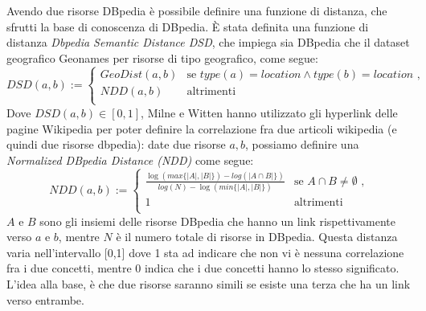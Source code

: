 Avendo due risorse DBpedia è possibile definire una funzione di distanza, che sfrutti la base di conoscenza di DBpedia. \`E stata definita  una funzione di distanza \emph{Dbpedia Semantic Distance DSD}, che impiega sia DBpedia che il dataset geografico Geonames per risorse di tipo geografico, come segue:
\begin{equation} \label{eq:dbpedia_semantic_distance}
DSD(a,b):=\begin{cases}
GeoDist(a,b) & \text{se $type(a)=location \land type(b)=location$  ,}\\
NDD(a,b) & \text{altrimenti}\\
\end{cases}
\end{equation}
Dove $DSD(a,b) \in [0,1]$,
Milne e Witten \cite{Milne08aneffective} hanno utilizzato gli hyperlink delle pagine Wikipedia per poter definire la correlazione fra due articoli wikipedia (e quindi due risorse dbpedia): date due risorse $a,b$, possiamo definire una \emph{Normalized DBpedia Distance (NDD)} come segue:
\begin{equation} \label{eq:normalized_dbpedia_distance}
NDD(a,b):=\begin{cases}
\frac{\log(max\{|A|,|B|\})-log( |A \cap B|\})}{log(N)-\log(min\{|A|,|B|\})} & \text{se $A \cap B \neq \emptyset $  ,}\\
1 & \text{altrimenti}\\
\end{cases}
\end{equation}
 $A$ e $B$  sono gli insiemi delle risorse DBpedia che hanno un link rispettivamente verso $a$ e $b$, mentre $N$ è il numero totale di risorse in DBpedia. Questa distanza varia nell'intervallo [0,1] dove 1 sta ad indicare che non vi è nessuna correlazione fra i due concetti, mentre 0 indica che i due concetti hanno lo stesso significato. L'idea alla base, è che due risorse saranno simili se esiste una terza che ha un link verso entrambe.
 
 
